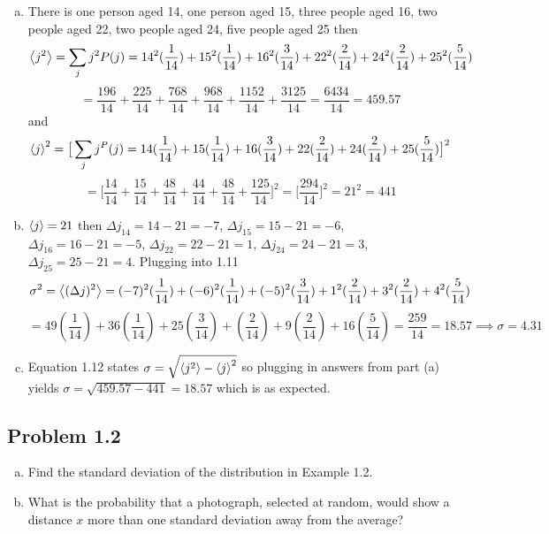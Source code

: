 \documentclass[12pt]{exam}
\begin{document}
\begin{solution}
    \begin{enumerate}[(a)]
        \item There is one person aged 14, one person aged 15, three people aged 16, two people aged 22, two people aged 24, five people aged 25 then 
        $$\expval{j^2} = \sum_j j^2 P(j) = 14^2(\frac{1}{14}) + 15^2(\frac{1}{14}) + 16^2(\frac{3}{14})+ 22^2(\frac{2}{14})+ 24^2(\frac{2}{14})+ 25^2(\frac{5}{14})$$
        $$= \frac{196}{14} + \frac{225}{14}+ \frac{768}{14}+ \frac{968}{14}+ \frac{1152}{14}+ \frac{3125}{14} = \frac{6434}{14} = 459.57$$
        and 
        $$\expval{j}^2 =  \big[\sum_j j^ P(j) = 14(\frac{1}{14}) + 15(\frac{1}{14}) + 16(\frac{3}{14})+ 22(\frac{2}{14})+ 24(\frac{2}{14})+ 25(\frac{5}{14})\big]^2$$
        $$= \big[ \frac{14}{14}+ \frac{15}{14} + \frac{48}{14} + \frac{44}{14} + \frac{48}{14} + \frac{125}{14}\big]^2 = \big[\frac{294}{14}\big]^2 = 21^2 = 441$$

        \item $\expval{j}=21$ then $\Delta j_{14} = 14-21 = -7$, $\Delta j_{15} = 15-21 = -6$, $\Delta j_{16} = 16-21 = -5$,  $\Delta j_{22} = 22-21 = 1$, $\Delta j_{24} = 24-21 = 3$, $\Delta j_{25} = 25-21 = 4$.  Plugging into 1.11 $$\sigma^2 = \expval{(\Delta j)^2}  = (-7)^2(\frac{1}{14}) + (-6)^2(\frac{1}{14}) + (-5)^2(\frac{3}{14})+ 1^2(\frac{2}{14})+ 3^2(\frac{2}{14})+ 4^2(\frac{5}{14})$$ 
        $$
        = 49(\frac{1}{14}) + 36(\frac{1}{14}) + 25(\frac{3}{14})+ (\frac{2}{14})+ 9(\frac{2}{14})+ 16(\frac{5}{14})= \frac{259}{14} = 18.57 \implies\sigma = 4.31$$

        \item Equation 1.12 states $\sigma = \sqrt{\expval{j^2}-\expval{j}^2}$ so plugging in answers from part (a) yields $\sigma =\sqrt{459.57-441} = 18.57$ which is as expected.
    \end{enumerate}
\end{solution}




\subsection*{Problem 1.2}
\begin{enumerate}[(a)]
    \item Find the standard deviation of the distribution in Example 1.2.


    \item What is the probability that a photograph, selected at random, would show a distance $x$ more than one standard deviation away from the average?
\end{enumerate}
\end{document}
